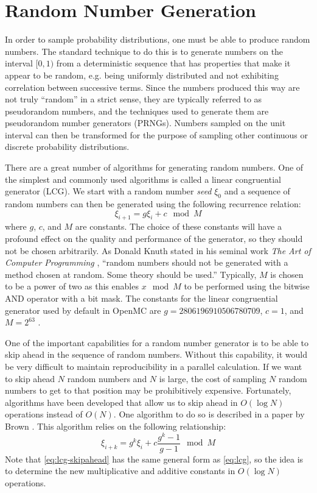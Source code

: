 \section{Random Number Generation}

In order to sample probability distributions, one must be able to produce random
numbers. The standard technique to do this is to generate numbers on the
interval $[0,1)$ from a deterministic sequence that has properties that make it
  appear to be random, e.g. being uniformly distributed and not exhibiting
  correlation between successive terms. Since the numbers produced this way are
  not truly ``random'' in a strict sense, they are typically referred to as
  pseudorandom numbers, and the techniques used to generate them are
  pseudorandom number generators (PRNGs). Numbers sampled on the unit interval
  can then be transformed for the purpose of sampling other continuous or
  discrete probability distributions.

There are a great number of algorithms for generating random numbers. One of the
simplest and commonly used algorithms is called a linear congruential generator
(LCG). We start with a random number \emph{seed} $\xi_0$ and a sequence of
random numbers can then be generated using the following recurrence relation:
\begin{equation}
  \label{eq:lcg}
  \xi_{i+1} = g \xi_i + c \mod M
\end{equation}
where $g$, $c$, and $M$ are constants. The choice of these constants will have a
profound effect on the quality and performance of the generator, so they should
not be chosen arbitrarily. As Donald Knuth stated in his seminal work \emph{The
  Art of Computer Programming} \cite{knuth-2006}, ``random numbers should not be
generated with a method chosen at random. Some theory should be used.''
Typically, $M$ is chosen to be a power of two as this enables $x \mod M$ to be
performed using the bitwise AND operator with a bit mask. The constants for the
linear congruential generator used by default in OpenMC are $g =
2806196910506780709$, $c = 1$, and $M = 2^{63}$ \cite{mathcomp-lecuyer-1999}.

One of the important capabilities for a random number generator is to be able to
skip ahead in the sequence of random numbers. Without this capability, it would
be very difficult to maintain reproducibility in a parallel calculation. If we
want to skip ahead $N$ random numbers and $N$ is large, the cost of sampling $N$
random numbers to get to that position may be prohibitively
expensive. Fortunately, algorithms have been developed that allow us to skip
ahead in $O(\log N)$ operations instead of $O(N)$. One algorithm to do so is
described in a paper by Brown \cite{trans-brown-1994}. This algorithm relies on
the following relationship:
\begin{equation}
  \label{eq:lcg-skipahead}
  \xi_{i+k} = g^k \xi_i + c \frac{g^k - 1}{g - 1} \mod M
\end{equation}
Note that \eqref{eq:lcg-skipahead} has the same general form as \eqref{eq:lcg},
so the idea is to determine the new multiplicative and additive constants in
$O(\log N)$ operations.

